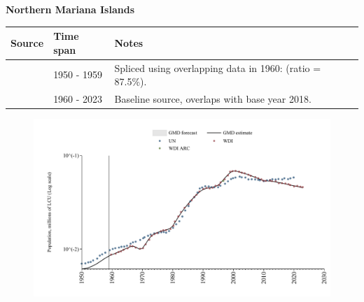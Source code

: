 \documentclass[12pt,a4paper,landscape]{article}
\begin{document}
\begin{adjustbox}{max totalsize={\paperwidth}{\paperheight},center}
\begin{minipage}[t][\textheight][t]{\textwidth}
\vspace*{0.5cm}
{}
\begin{center}
{\Large\bfseries Northern Mariana Islands}
\end{center}
\vspace{0.5cm}
\begin{table}[H]
\centering
\small
\begin{tabular}{|l|l|l|}
\hline
\textbf{Source} & \textbf{Time span} & \textbf{Notes} \\
\hline
\rowcolor{white}\cite{UN}& 1950 - 1959 &Spliced using overlapping data in 1960: (ratio = 87.5\%).\\
\rowcolor{lightgray}\cite{WDI}& 1960 - 2023 &Baseline source, overlaps with base year 2018.\\
\hline
\end{tabular}
\end{table}
\begin{figure}[H]
\centering
\includegraphics[width=\textwidth,height=0.6\textheight,keepaspectratio]{graphs/MNP_pop.pdf}
\end{figure}
\end{minipage}
\end{adjustbox}
\end{document}
